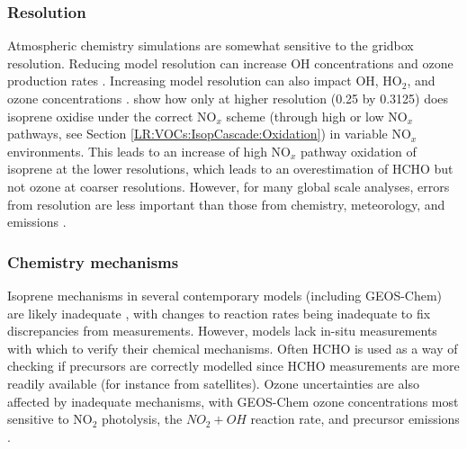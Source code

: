       
    \subsubsection{Resolution}
      \label{LR:Models:Uncert:Resolution}
      
      Atmospheric chemistry simulations are somewhat sensitive to the gridbox resolution.
      Reducing model resolution can increase OH concentrations and ozone production rates \parencite{Wild2006}.
      Increasing model resolution can also impact OH, HO$_2$, and ozone concentrations \parencite[e.g.][]{Christian2017}.
      \textcite{Yu2016} show how only at higher resolution (0.25 by 0.3125\degr) does isoprene oxidise under the correct NO$_x$ scheme (through high or low NO$_x$ pathways, see Section \ref{LR:VOCs:IsopCascade:Oxidation}) in variable NO$_x$ environments.
      This leads to an increase of high NO$_x$ pathway oxidation of isoprene at the lower resolutions, which leads to an overestimation of HCHO but not ozone at coarser resolutions.
      However, for many global scale analyses, errors from resolution are less important than those from chemistry, meteorology, and emissions \parencite{Christian2017, Christian2018}.
      
            
    \subsubsection{Chemistry mechanisms}
      \label{LR:Models:Uncert:Chemistry}
      
      
      Isoprene mechanisms in several contemporary models (including GEOS-Chem) are likely inadequate \parencite{Marvin2017}, with changes to reaction rates being inadequate to fix discrepancies from measurements.
      However, models lack in-situ measurements with which to verify their chemical mechanisms. %
      Often HCHO is used as a way of checking if precursors are correctly modelled since HCHO measurements are more readily available (for instance from satellites).
      Ozone uncertainties are also affected by inadequate mechanisms, with GEOS-Chem ozone concentrations most sensitive to NO$_2$ photolysis, the $NO_2 + OH$ reaction rate, and precursor emissions \parencite{Christian2017}.
      
